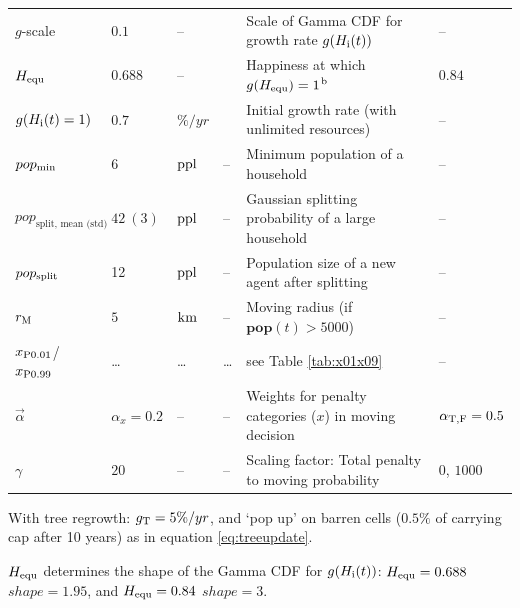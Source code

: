 \begin{flushleft}
\begin{table}
\begin{tabular}{P|W|W|M|K|Q}
		  $g$-scale & $0.1$ & -- & \citet{Lee2008} & Scale of Gamma CDF for growth rate $g(H_{\rm i}(t))$ & -- \\
		  $H_{\rm equ}$  & $0.688$& -- & \citet{Puleston2017} & 
		  Happiness at which $g(H_{\rm equ})=1$$^{\rm b}$& $0.84$\\
		  
		  $g(H_{\rm i}(t)=1)$ & $0.7$ & $\%/yr$ & \citet{Bahn2017} & Initial growth rate (with unlimited resources) & -- \\ \hline
		  $pop_{\rm min}$ & 6 & ${\rm ppl}$ & -- & Minimum population of a household & --\\
		  $pop_\text{split, mean (std)}$  & $42\ (3) $& ${\rm ppl}$ & -- & Gaussian splitting probability of a large household & --\\
		  $pop_{\rm split}$ & 12 & ${\rm ppl}$ & -- & Population size of a new agent after splitting & --\\ \hline
		  
		  $r_{\rm M}$ & $5$ & ${\rm km}$ & -- & Moving radius (if $\mathbf{pop}(t)>5000$) & -- \\
		  
		  $x_{\rm P0.01}$/$x_{\rm P0.99}$ & \ldots & \ldots & \ldots & see Table \ref{tab:x01x09} & -- \\
		  $\vec{\alpha}$ & $\alpha_x=0.2$ & -- & -- & Weights for penalty categories ($x$) in moving decision & $\alpha_{\rm T,F} = 0.5$ \\
		  $\gamma$ & $20$ & -- & -- & Scaling factor: Total penalty to moving probability&  $0$, $1000$\\
		\end{tabular}
  \label{tab:sensitivity}
  	\begin{itemize}
  		  \setlength\itemsep{-8pt}
  	{\scriptsize
  	\item[a] With tree regrowth: $g_{\rm T} = 5\%/yr$, and `pop up' on barren cells ($0.5\%$ of carrying cap after 10 years) as in equation \ref{eq:treeupdate}.
  	\item[b] $H_{\rm equ}$ determines the shape of the Gamma CDF for $g(H_{\rm i}(t))$: $H_{\rm equ}=0.688$ \ra $shape = 1.95$, and  $H_{\rm equ}=0.84$ \ra $shape = 3$.
  }
  \end{itemize}
\end{table}
\end{flushleft}
